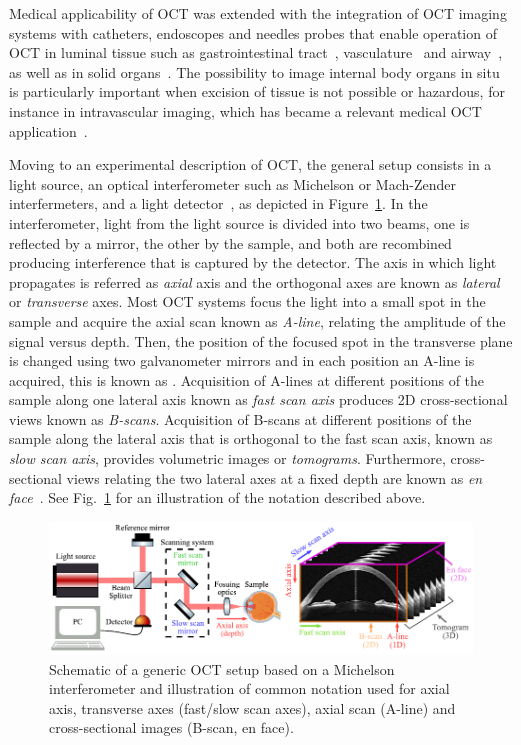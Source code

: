 Medical applicability of OCT was extended with the integration of OCT imaging systems with catheters, endoscopes and needles probes that enable operation of OCT in luminal tissue such as gastrointestinal tract~\cite{Jackle2000_Vivo}, vasculature~\cite{Tearney1996_CatheterBased} and airway~\cite{Armstrong2003_Vivo}, as well as in solid organs~\cite{McLaughlin2012_Imaging}. The possibility to image internal body organs in situ is particularly important when excision of tissue is not possible or hazardous, for instance in intravascular imaging, which has became a relevant medical OCT application~\cite{Bouma2017_Intravascular}.

Moving to an experimental description of OCT, the general setup consists in a light source, an optical interferometer such as Michelson or Mach-Zender interfermeters, and a light detector~\cite{Huang1991_Optical}, as depicted in Figure~\ref{fig:OCT_ScanningScheme}. In the interferometer, light from the light source is divided into two beams, one is reflected by a mirror, the other by the sample, and both are recombined producing interference that is captured by the detector. The axis in which light propagates is referred as \textit{axial} axis and the orthogonal axes are known as \textit{lateral} or \textit{transverse} axes. Most OCT systems focus the light into a small spot in the sample and acquire the axial scan known as \textit{A-line}, relating the amplitude of the signal versus depth. Then, the position of the focused spot in the transverse plane is changed using two galvanometer mirrors and in each position an A-line is acquired, this is known as . Acquisition of A-lines at different positions of the sample along one lateral axis known as \textit{fast scan axis} produces 2D cross-sectional views known as \textit{B-scans}. Acquisition of B-scans at different positions of the sample along the lateral axis that is orthogonal to the fast scan axis, known as \textit{slow scan axis}, provides volumetric images or \textit{tomograms}. Furthermore, cross-sectional views relating the two lateral axes at a fixed depth are known as \textit{en face}~\cite{Fujimoto2015_Introduction}. See Fig.~\ref{fig:OCT_ScanningScheme} for an illustration of the notation described above.

\begin{figure}
    \centering
    \includegraphics[width=\textwidth]{Figures/Introduction/OCT_ScanningSchemes.pdf}
    \caption{Schematic of a generic OCT setup based on a Michelson interferometer and illustration of common notation used for axial axis, transverse axes (fast/slow scan axes), axial scan (A-line) and cross-sectional images (B-scan, en face).}
    \label{fig:OCT_ScanningScheme}
\end{figure}

